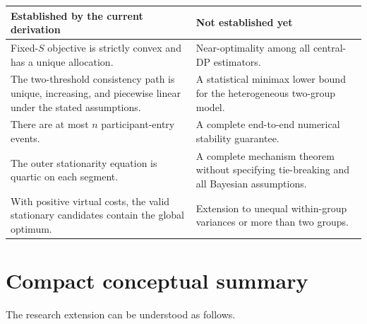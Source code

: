 \documentclass[11pt,a4paper]{article}
\newcommand{\1}{\mathbf{1}}
\begin{document}
\begin{center}
\begin{tabular}{p{}p{}}
\toprule
\textbf{Established by the current derivation} &
\textbf{Not established yet}\\
\midrule
Fixed-\(S\) objective is strictly convex and has a unique allocation. &
Near-optimality among all central-DP estimators.\\
The two-threshold consistency path is unique, increasing, and
piecewise linear under the stated assumptions. &
A statistical minimax lower bound for the heterogeneous two-group model.\\
There are at most \(n\) participant-entry events. &
A complete end-to-end numerical stability guarantee.\\
The outer stationarity equation is quartic on each segment. &
A complete mechanism theorem without specifying tie-breaking and all
Bayesian assumptions.\\
With positive virtual costs, the valid stationary candidates contain
the global optimum. &
Extension to unequal within-group variances or more than two groups.\\
\bottomrule
\end{tabular}
\end{center}

\section{Compact conceptual summary}

The research extension can be understood as follows.
\end{document}

